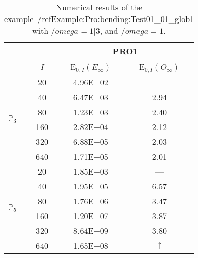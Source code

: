 \begin{table}[H]
\caption{Numerical results of the example~/ref{Example:Pro:bending:Test01_01_glob1} with $/omega=1|3$, and $/omega=1$.}
\setlength{\tabcolsep}{5pt}
\centering
\begin{tabular}{@{}l c c c@{}}
\toprule
 &  & \multicolumn{2}{c}{PRO1}\\
\midrule
 & $I$ & E$_{0,I}(E_{\infty})$ & E$_{0,I}(O_{\infty})$\\
\midrule
\multirow{6}{*}{$\mathbb{P}_{3}$}
 & 20 & 4.96E$-$02 & ---\\
 & 40 & 6.47E$-$03 & 2.94\\
 & 80 & 1.23E$-$03 & 2.40\\
 & 160 & 2.82E$-$04 & 2.12\\
 & 320 & 6.88E$-$05 & 2.03\\
 & 640 & 1.71E$-$05 & 2.01\\
\midrule
\multirow{6}{*}{$\mathbb{P}_{5}$}
 & 20 & 1.85E$-$03 & ---\\
 & 40 & 1.95E$-$05 & 6.57\\
 & 80 & 1.76E$-$06 & 3.47\\
 & 160 & 1.20E$-$07 & 3.87\\
 & 320 & 8.64E$-$09 & 3.80\\
 & 640 & 1.65E$-$08 & $\uparrow$\\
\bottomrule
\end{tabular}
\label{Table:PRO:test_01_01_test32_pro1}
\end{table}
